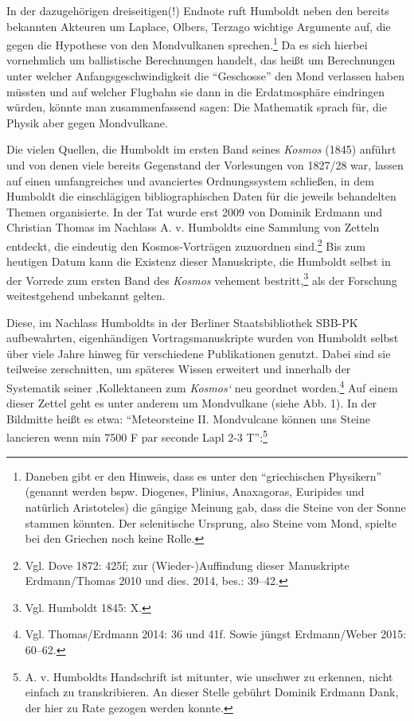 \documentclass[a4paper,
fontsize=11pt,
oneside,
numbers=noperiodatend,
parskip=half-,
bibliography=totoc,
final
]{scrartcl}
\begin{document}
In der dazugehörigen dreiseitigen(!) Endnote ruft Humboldt neben den
bereits bekannten Akteuren um Laplace, Olbers, Terzago wichtige
Argumente auf, die gegen die Hypothese von den Mondvulkanen
sprechen.\footnote{Daneben gibt er den Hinweis, dass es unter den
  \enquote{griechischen Physikern} (genannt werden bspw. Diogenes,
  Plinius, Anaxagoras, Euripides und natürlich Aristoteles) die gängige
  Meinung gab, dass die Steine von der Sonne stammen könnten. Der
  selenitische Ursprung, also Steine vom Mond, spielte bei den Griechen
  noch keine Rolle.} Da es sich hierbei vornehmlich um ballistische
Berechnungen handelt, das heißt um Berechnungen unter welcher
Anfangsgeschwindigkeit die \enquote{Geschosse} den Mond verlassen haben
müssten und auf welcher Flugbahn sie dann in die Erdatmosphäre
eindringen würden, könnte man zusammenfassend sagen: Die Mathematik
sprach für, die Physik aber gegen Mondvulkane.

Die vielen Quellen, die Humboldt im ersten Band seines \emph{Kosmos}
(1845) anführt und von denen viele bereits Gegenstand der Vorlesungen
von 1827/28 war, lassen auf einen umfangreiches und avanciertes
Ordnungssystem schließen, in dem Humboldt die einschlägigen
bibliographischen Daten für die jeweils behandelten Themen organisierte.
In der Tat wurde erst 2009 von Dominik Erdmann und Christian Thomas im
Nachlass A. v. Humboldts eine Sammlung von Zetteln entdeckt, die
eindeutig den Kosmos-Vorträgen zuzuordnen sind.\footnote{Vgl. Dove 1872:
  425f; zur (Wieder-)Auffindung dieser Manuskripte Erdmann/Thomas 2010
  und dies. 2014, bes.: 39--42.} Bis zum heutigen Datum kann die
Existenz dieser Manuskripte, die Humboldt selbst in der Vorrede zum
ersten Band des \emph{Kosmos} vehement bestritt,\footnote{Vgl. Humboldt
  1845: X.} als der Forschung weitestgehend unbekannt gelten.

Diese, im Nachlass Humboldts in der Berliner Staatsbibliothek SBB-PK
aufbewahrten, eigenhändigen Vortragsmanuskripte wurden von Humboldt
selbst über viele Jahre hinweg für verschiedene Publikationen genutzt.
Dabei sind sie teilweise zerschnitten, um späteres Wissen erweitert und
innerhalb der Systematik seiner ‚Kollektaneen zum \emph{Kosmos`} neu
geordnet worden.\footnote{Vgl. Thomas/Erdmann 2014: 36 und 41f. Sowie
  jüngst Erdmann/Weber 2015: 60--62.} Auf einem dieser Zettel geht es
unter anderem um Mondvulkane (siehe Abb. 1). In der Bildmitte heißt es
etwa: \enquote{Meteorsteine II. Mondvulcane können uns Steine lancieren
wenn min 7500 F par seconde Lapl 2-3 T}:\footnote{A. v. Humboldts
  Handschrift ist mitunter, wie unschwer zu erkennen, nicht einfach zu
  transkribieren. An dieser Stelle gebührt Dominik Erdmann Dank, der
  hier zu Rate gezogen werden konnte.}
\end{document}

